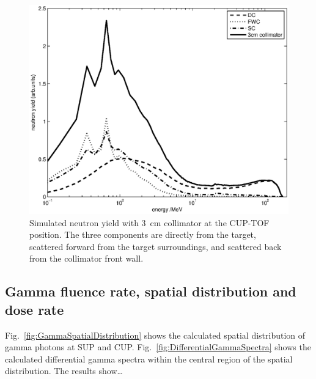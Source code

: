\documentclass[11pt,a4paper]{IEEEtran}
\let\MYoriglatexcaption\caption
\renewcommand{\caption}[2][\relax]{\MYoriglatexcaption[#2]{#2}}
\begin{document}
\begin{figure}[t]
	\centering
	\includegraphics[width=\columnwidth]{TOF3Componentslinear.eps}
	\caption{
        Simulated neutron yield with \SI{3}{\cm} collimator at the CUP-TOF position.
        The three components are directly from the target, scattered forward from the target surroundings, and scattered back from the collimator front wall.
    }
	\label{fig:TOF3Componentslinear}
\end{figure}

\subsection{Gamma fluence rate, spatial distribution and dose rate}
Fig.~\ref{fig:GammaSpatialDistribution} shows the calculated spatial distribution of gamma photons at SUP and CUP.
Fig.~\ref{fig:DifferentialGammaSpectra} shows the calculated differential gamma spectra within the central region of the spatial distribution.
The results show\ldots
{}
\end{document}
